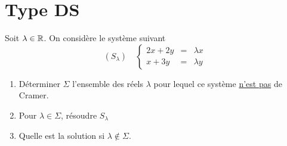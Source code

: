 \documentclass[a4paper, 11pt,reqno]{article}
\begin{document}
\section*{Type DS}



\begin{exercice}
Soit $\lambda \in \mathbb{R}$. On considère le système suivant 
$$(S_\lambda)\quad  \left\{ \begin{array}{ccc}
2x +2y & =& \lambda x\\
x +3y  & =& \lambda y 
\end{array}\right. $$

\begin{enumerate}
\item Déterminer $\Sigma$ l'ensemble des réels $\lambda$ pour lequel ce système \underline{n'est pas} de Cramer. 
\item Pour $\lambda \in \Sigma$, résoudre $S_\lambda$
\item Quelle est la solution si $\lambda \notin \Sigma$. 
\end{enumerate}
\end{exercice}
\end{document}
